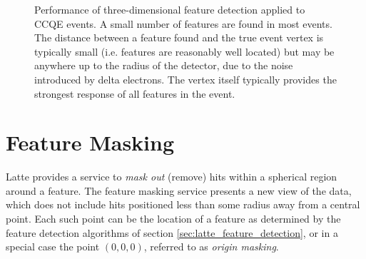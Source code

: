 \begin{figure}
\centering
{}
\caption[Performance of the feature detection service in 3D]{\label{fig:feature_3d}Performance of three-dimensional feature detection applied to \acs{CCQE} events.  A small number of features are found in most events.  The distance between a feature found and the true event vertex is typically small (i.e. features are reasonably well located) but may be anywhere up to the radius of the detector, due to the noise introduced by delta electrons.  The vertex itself typically provides the strongest response of all features in the event.}
\end{figure}

\section{Feature Masking}
Latte provides a service to \emph{mask out} (remove) hits within a spherical region around a feature. The feature masking service presents a new view of the data, which does not include hits positioned less than some radius away from a central point. Each such point can be the location of a feature as determined by the feature detection algorithms of section \ref{sec:latte_feature_detection}, or in a special case the point $(0,0,0)$, referred to as \emph{origin masking}.

